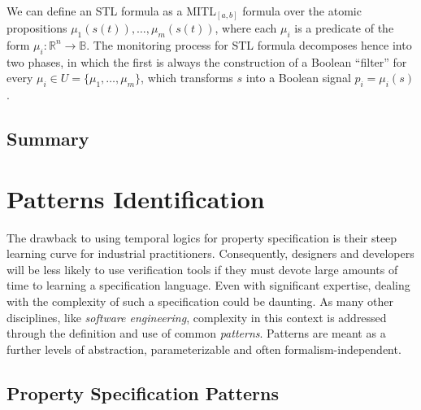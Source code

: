 \paragraph{} We can define an STL formula as a MITL$_{[a,b]}$ formula over the atomic propositions $\mu_1(s(t)),\dots,\mu_m(s(t))$, where each $\mu_i$ is a predicate of the form $\mu_i:\mathbb{R}^n\rightarrow\mathbb{B}$. The monitoring process for STL formula decomposes hence into two phases, in which the first is always the construction of a Boolean “filter” for every $\mu_i \in U = \{\mu_1 , \dots ,\mu_m \}$, which transforms $s$ into a Boolean signal $p_i = \mu_i(s)$.

\subsection{Summary}

\section{Patterns Identification}

The drawback to using temporal logics for property specification is their steep learning curve for industrial practitioners. Consequently, designers and developers will be less likely to use verification tools if they must devote large amounts of time to learning a specification language. Even with significant expertise, dealing with the complexity of such a specification could be daunting. As many other disciplines, like \textit{software engineering}, complexity in this context is addressed through the definition and use of common \textit{patterns}. Patterns are meant as a further levels of abstraction, parameterizable and often formalism-independent. 

\subsection{Property Specification Patterns}


